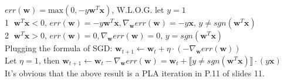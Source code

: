 \documentclass[a4paper,12pt]{article}
\begin{document}
\section {}
$err(\mathbf{w})=\text{max}(0, -y\mathbf{w}^{T}\mathbf{x})$, W.L.O.G. let $y=1$ \\
\textcircled{1} $\mathbf{w}^{T}\mathbf{x}<0, \, err(\mathbf{w})=-y\mathbf{w}^{T}\mathbf{x}, \nabla_{\mathbf{w}} err(\mathbf{w})=-y\mathbf{x}, \, y \neq sgn(\mathbf{w}^{T}\mathbf{x})$   \\
\textcircled{2} $\mathbf{w}^{T}\mathbf{x}>0, \, err(\mathbf{w})=0, \nabla_{\mathbf{w}} err(\mathbf{w})=0, \, y = sgn(\mathbf{w}^{T}\mathbf{x})$ \\
Plugging the formula of SGD: $\mathbf{w}_{t+1} \leftarrow \mathbf{w}_{t} + \eta \cdot (-\nabla_{\mathbf{w}} err(\mathbf{w}))$ \\
Let $\eta=1$, then $\mathbf{w}_{t+1} \leftarrow \mathbf{w}_{t}-\nabla_{\mathbf{w}} err(\mathbf{w}) = \mathbf{w}_{t} + \llbracket y \neq sgn(\mathbf{w}^{T}\mathbf{x})\rrbracket \cdot (y\mathbf{x})$ \\
It's obvious that the above result is a PLA iteration in P.11 of slides 11.
\end{document}
